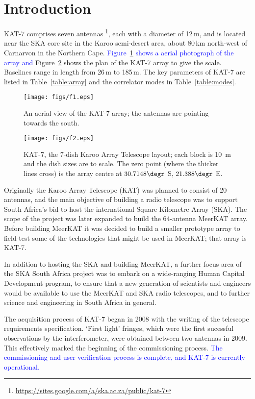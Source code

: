 \section{Introduction}
\noindent

KAT-7 comprises seven antennas
\footnote{\url{https://sites.google.com/a/ska.ac.za/public/kat-7}},
each with a diameter of 12\,m, and is located near the SKA core site
in the Karoo semi-desert area, about 80\,km north-west of Carnarvon in
the Northern Cape.  \textcolor{blue}{Figure~\ref{fig:aerial} shows a
  aerial photograph of the array and} Figure~\ref{fig:layout} shows
the plan of the KAT-7 array to give the scale. Baselines range in
length from 26\,m to 185\,m. The key parameters of KAT-7 are listed in
Table~\ref{table:array} and the correlator modes in
Table~\ref{table:modes}.

\begin{figure}
\texttt{[image: figs/f1.eps]}
\caption{An aerial view of the KAT-7 array; the antennas are pointing 
towards the south.}
\label{fig:aerial}
\end{figure}


\begin{figure} 
  \texttt{[image: figs/f2.eps]}
  \caption{KAT-7, the 7-dish Karoo Array Telescope layout; each block
    is 10~m and the dish sizes are to scale. The zero point (where the
    thicker lines cross) is the array centre at $30.7148\degr$ S,
    $21.388\degr$ E.}
\label{fig:layout}
\end{figure}

Originally the Karoo Array Telescope (KAT) was planned to consist of
20 antennas, and the main objective of building a radio telescope was
to support South Africa's bid to host the international Square
Kilometre Array (SKA). The scope of the project was later expanded to
build the 64-antenna MeerKAT array.  Before building MeerKAT it was
decided to build a smaller prototype array to field-test some of the
technologies that might be used in MeerKAT; that array is KAT-7.

In addition to hosting the SKA and building MeerKAT, a further focus
area of the SKA South Africa project was to embark on a wide-ranging
Human Capital Development program, to ensure that a new generation of
scientists and engineers would be available to use the MeerKAT and SKA
radio telescopes, and to further science and engineering in South
Africa in general.


The acquisition process of KAT-7 began in 2008 with the writing of the
telescope requirements specification. `First light' fringes, which
were the first sucessful observations by the interferometer, were obtained
between two antennas in 2009. This effectively marked the beginning of
the commissioning process. \textcolor{blue}{The commissioning and user
  verification process is complete, and KAT-7 is currently operational.}

